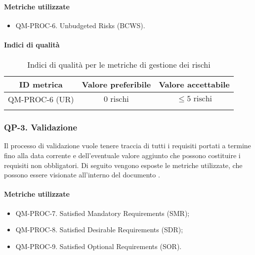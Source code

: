		\paragraph{Metriche utilizzate}

			\begin{itemize}
				\item QM-PROC-6. Unbudgeted Risks (BCWS).
			\end{itemize}

		\paragraph{Indici di qualità}

			\begin{center}
				\begin{longtable}{|c|c|c|}
				\hline
				\rowcolor{lighter-grayer}
				\textbf{ID metrica} & \textbf{Valore preferibile} & \textbf{Valore accettabile}\\
				\hline
				\endfirsthead
				\hline
				QM-PROC-6 (UR) & \(0 \text{ rischi}\) & \(\le 5 \text{ rischi}\) \\
				\hline
				\caption{Indici di qualità per le metriche di gestione dei rischi}
				\end{longtable}
			\end{center}

	\subsubsection{QP-3. Validazione}

		Il processo di validazione vuole tenere traccia di tutti i requisiti portati a termine fino alla data corrente e dell'eventuale valore aggiunto che possono costituire i requisiti non obbligatori.
		Di seguito vengono esposte le metriche utilizzate, che possono essere visionate all'interno del documento .

		\paragraph{Metriche utilizzate}

			\begin{itemize}
				\item QM-PROC-7. Satisfied Mandatory Requirements (SMR);
				\item QM-PROC-8. Satisfied Desirable Requirements (SDR);
				\item QM-PROC-9. Satisfied Optional Requirements (SOR).
			\end{itemize}


